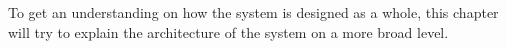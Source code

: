 
To get an understanding on how the system is designed as a whole, this chapter will try to explain the architecture of the system on a more broad level.





